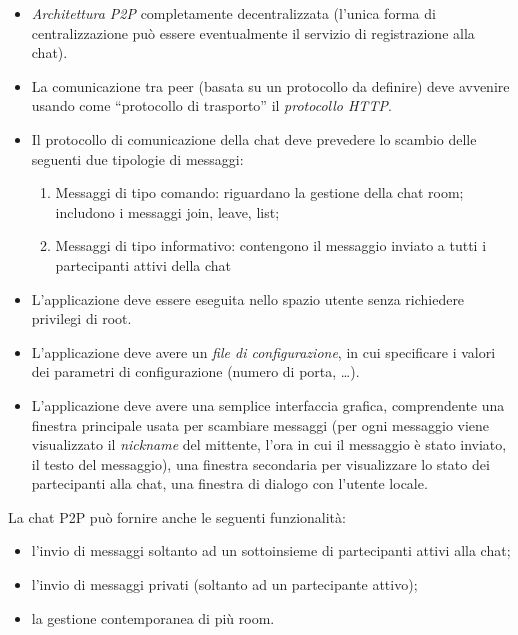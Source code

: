 \begin{itemize}
\item \textit{Architettura P2P} completamente decentralizzata (l’unica forma di centralizzazione può essere eventualmente il servizio di registrazione alla chat).
\item La comunicazione tra peer (basata su un protocollo da definire) deve avvenire usando come “protocollo di trasporto” il \textit{protocollo HTTP}.
\item Il protocollo di comunicazione della chat deve prevedere lo scambio delle seguenti due tipologie di messaggi:
\begin{enumerate}
\item Messaggi di tipo comando: riguardano la gestione della chat room; includono i messaggi join, leave, list;
\item Messaggi di tipo informativo: contengono il messaggio inviato a tutti i partecipanti attivi della chat
\end{enumerate}
\item L’applicazione deve essere eseguita nello spazio utente senza richiedere privilegi di root.
\item L’applicazione deve avere un \textit{file di configurazione}, in cui specificare i valori dei parametri di configurazione (numero di porta, …).
\item L’applicazione deve avere una semplice interfaccia grafica, comprendente una finestra principale usata per scambiare messaggi (per ogni messaggio viene visualizzato il \textit{nickname} del mittente, l’ora in cui il messaggio è stato inviato, il testo del messaggio), una finestra secondaria per visualizzare lo stato dei partecipanti alla chat, una finestra di dialogo con l’utente locale.
\end{itemize}
La chat P2P può fornire anche le seguenti funzionalità:
\begin{itemize}
\item l’invio di messaggi soltanto ad un sottoinsieme di partecipanti attivi alla chat;
\item l’invio di messaggi privati (soltanto ad un partecipante attivo);
\item la gestione contemporanea di più room.
\end{itemize}
